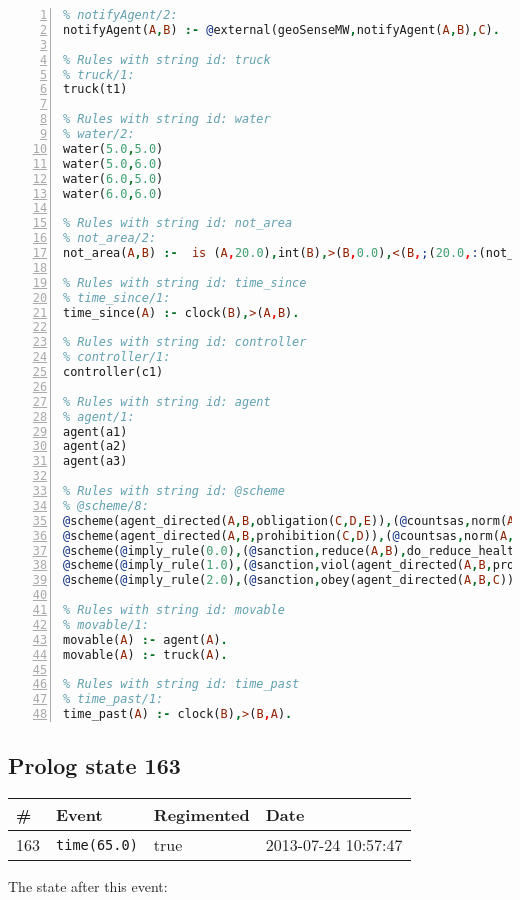 \documentclass[11pt]{article}\usepackage[utf8]{inputenc}\usepackage{geometry}
\begin{document}
\begin{lstlisting}[language=Prolog, numbers=left]
% Rules with string id: notifyAgent
% notifyAgent/2:
notifyAgent(A,B) :- @external(geoSenseMW,notifyAgent(A,B),C).

% Rules with string id: truck
% truck/1:
truck(t1)

% Rules with string id: water
% water/2:
water(5.0,5.0)
water(5.0,6.0)
water(6.0,5.0)
water(6.0,6.0)

% Rules with string id: not_area
% not_area/2:
not_area(A,B) :-  is (A,20.0),int(B),>(B,0.0),<(B,;(20.0,:(not_area(A,B), is (-(B),20.0)))),int(A),>(A,0.0),<(A,;(20.0,:(area(A,B),-(int(A))))),int(B),>(A,0.0),>(B,0.0),<(A,21.0),<(B,21.0).

% Rules with string id: time_since
% time_since/1:
time_since(A) :- clock(B),>(A,B).

% Rules with string id: controller
% controller/1:
controller(c1)

% Rules with string id: agent
% agent/1:
agent(a1)
agent(a2)
agent(a3)

% Rules with string id: @scheme
% @scheme/8:
@scheme(agent_directed(A,B,obligation(C,D,E)),(@countsas,norm(A,B,F,obligation(C,D,E)),F),false,(listTrue(C)),(time_past(D)),false,[plus(viol(agent_directed(A,B,obligation(C,D,E))))|[]],[plus(obey(agent_directed(A,B,obligation(C,D,E))))|[]])
@scheme(agent_directed(A,B,prohibition(C,D)),(@countsas,norm(A,B,E,prohibition(C,D)),E),(listTrue(C)),false,(false),false,[plus(viol(agent_directed(A,B,prohibition(C,D))))|[]],[plus(obey(agent_directed(A,B,prohibition(C,D))))|[]])
@scheme(@imply_rule(0.0),(@sanction,reduce(A,B),do_reduce_health(A,B),notifyAgent(A,changed(status))),true,false,false,false,[min(reduce(A,B))|[]],[])
@scheme(@imply_rule(1.0),(@sanction,viol(agent_directed(A,B,prohibition(C,D))),do_sanction(D)),true,false,false,false,[min(viol(agent_directed(A,B,prohibition(C,D))))|[]],[])
@scheme(@imply_rule(2.0),(@sanction,obey(agent_directed(A,B,C))),true,false,false,false,[min(obey(agent_directed(A,B,C)))|[]],[])

% Rules with string id: movable
% movable/1:
movable(A) :- agent(A).
movable(A) :- truck(A).

% Rules with string id: time_past
% time_past/1:
time_past(A) :- clock(B),>(B,A).

\end{lstlisting}
\clearpage 
\subsection{Prolog state 163}
\begin{table}[ht]
\centering 
\begin{tabular}{l l l l} 
\textbf{\#} & \textbf{Event} & \textbf{Regimented} & \textbf{Date} \\ [0.5ex] 
\hline
163&\texttt{time(65.0)}&true&2013-07-24 10:57:47\\ [1ex] \hline\end{tabular}
\end{table}
The state after this event:
\end{document}

